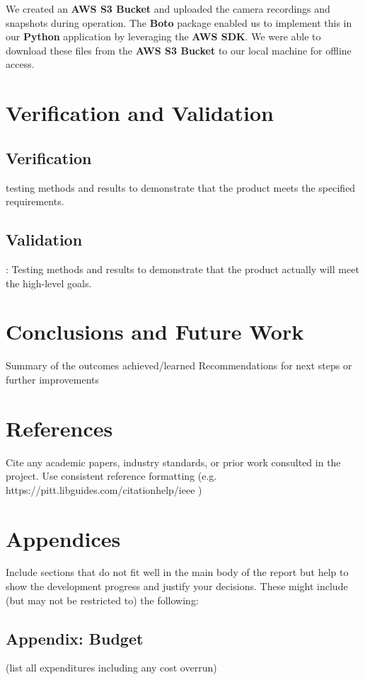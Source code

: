 \documentclass{article}
\begin{document}
\begin{minipage}{\linewidth}
    We created an \textbf{AWS S3 Bucket} and uploaded the camera recordings and snapshots during operation.
    The \textbf{Boto} package enabled us to implement this in our \textbf{Python} application by leveraging the \textbf{AWS SDK}.
    We were able to download these files from the \textbf{AWS S3 Bucket} to our local machine for offline access.
\end{minipage}

\section{Verification and Validation}
\subsection{Verification}
testing methods and results to demonstrate that the product meets the specified requirements. \\
\subsection{Validation}: Testing methods and results to demonstrate that the product actually will meet the high-level goals.

\section{Conclusions and Future Work}
Summary of the outcomes achieved/learned
Recommendations for next steps or further improvements


\section{References}
Cite any academic papers, industry standards, or prior work consulted in the project. Use consistent reference
formatting (e.g. https://pitt.libguides.com/citationhelp/ieee )


\section{Appendices}
Include sections that do not fit well in the main body of the report but help to show the development progress and justify your decisions. These might include (but may not be restricted to) the following:
\subsection{Appendix: Budget} (list all expenditures including any cost overrun)
\end{document}
